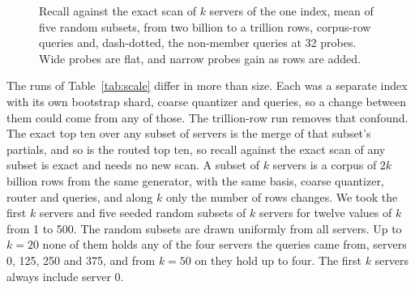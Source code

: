 \documentclass[sigconf, nonacm]{acmart}
\begin{document}
\begin{figure}[t]
\centering
{}
\caption{Recall against the exact scan of $k$ servers of the one index, mean of five random
subsets, from two billion to a trillion rows, corpus-row queries and, dash-dotted, the
non-member queries at 32 probes. Wide probes are flat, and narrow probes gain as rows are added.}
\label{fig:nested}
\end{figure}

The runs of Table~\ref{tab:scale} differ in more than size. Each was a separate index with its own
bootstrap shard, coarse quantizer and queries, so a change between them could come from any of
those. The trillion-row run removes that confound. The exact top ten over any subset of servers is
the merge of that subset's partials, and so is the routed top ten, so recall against the exact scan
of any subset is exact and needs no new scan. A subset of $k$ servers is a corpus of $2k$ billion
rows from the same generator, with the same basis, coarse quantizer, router and queries, and along
$k$ only the number of rows changes. We took the first $k$ servers and five seeded random subsets
of $k$ servers for twelve values of $k$ from 1 to 500. The random subsets are drawn uniformly
from all servers. Up to $k=20$ none of them holds any of the four servers the queries came from,
servers 0, 125, 250 and 375, and from $k=50$ on they hold up to four. The first $k$ servers always
include server 0.
\end{document}
